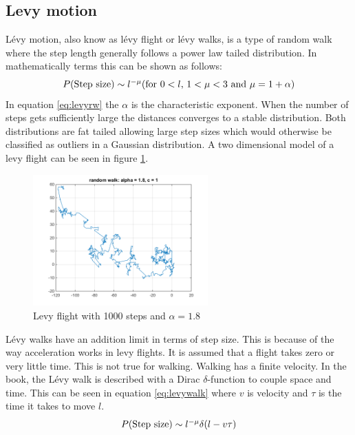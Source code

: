 \subsection{Levy motion}
Lévy motion, also know as lévy flight or lévy walks, is a type of random walk where the step length generally follows a power law tailed distribution. In mathematically terms this can be shown as follows:
\begin{equation}
P($Step size$) \sim l ^{-\mu} ($for $ 0 < l $, $1 < \mu < 3$ and $ \mu = 1 + \alpha)
\label{eq:levyrw}
\end{equation}
In equation \ref{eq:levyrw} the $\alpha$ is the characteristic exponent. When the number of steps gets sufficiently large the distances converges to a stable distribution. Both distributions are fat tailed allowing large step sizes which would otherwise be classified as outliers in a Gaussian distribution. A two dimensional model of a levy flight can be seen in figure \ref{fig:levywalk1}.
\begin{figure}[H]
\centering
\includegraphics[width = 0.6\textwidth]{billeder/levywalk1}
\caption{Levy flight with 1000 steps and $\alpha = 1.8$}
\label{fig:levywalk1}
\end{figure}
Lévy walks have an addition limit in terms of step size. This is because of the way acceleration works in levy flights. It is assumed that a flight takes zero or very little time. This is not true for walking. Walking has a finite velocity. In the book\cite{viswanathan2011the}, the Lévy walk is described with a Dirac $\delta$-function to couple space and time. This can be seen in equation \ref{eq:levywalk} where $v$ is velocity and $\tau$ is the time it takes to move $l$.
\begin{equation}
P($Step size$) \sim l ^{-\mu}\delta (l - v\tau)
\label{eq:levywalk}
\end{equation}

